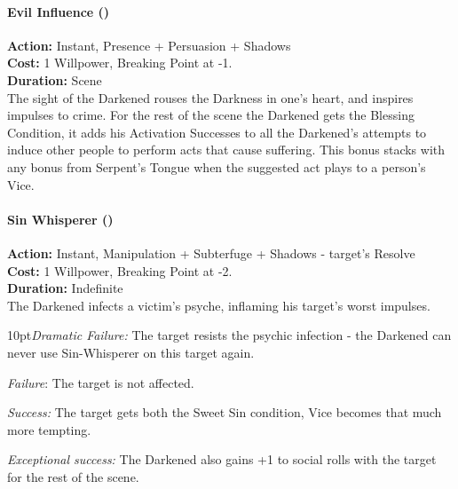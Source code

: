 \paragraph*{Evil Influence (\textbullet\textbullet)}

\noindent \textbf{Action:} Instant, Presence + Persuasion + Shadows\\

\noindent \textbf{Cost:} 1 Willpower, Breaking Point at -1.\\

\noindent \textbf{Duration:} Scene \\

\noindent The sight of the Darkened rouses the Darkness in one's heart, and inspires impulses to crime. For the rest of the scene the Darkened gets the Blessing Condition, it adds his Activation Successes to all the Darkened's attempts to induce other people to perform acts that cause suffering. This bonus stacks with any bonus from Serpent's Tongue when the suggested act plays to a person's Vice.\\

\paragraph*{Sin Whisperer (\textbullet\textbullet\textbullet)}

\noindent \textbf{Action:} Instant, Manipulation + Subterfuge + Shadows - target's Resolve \\

\noindent \textbf{Cost:} 1 Willpower, Breaking Point at -2.\\

\noindent \textbf{Duration:} Indefinite \\

\noindent The Darkened infects a victim's psyche, inflaming his target's worst impulses.

    \begin{myindentpar}{10pt}\emph{Dramatic Failure:} The target resists the psychic infection - the Darkened can never use Sin-Whisperer on this target again.
    
    \emph{Failure}: The target is not affected.
    
    \emph{Success:} The target gets both the Sweet Sin condition, Vice becomes that much more tempting. 
    
    \emph{Exceptional success:} The Darkened also gains +1 to social rolls with the target for the rest of the scene.\end{myindentpar}

